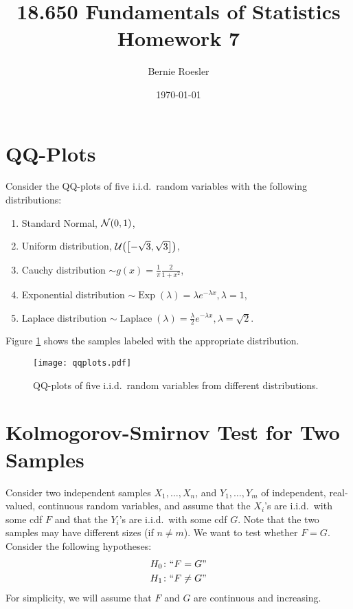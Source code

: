 \documentclass[letterpaper, reqno]{amsart}
\title[Homework 7 -- Problem \thesection]{18.650 Fundamentals of Statistics\\{\large Homework 7}}
\author{Bernie Roesler}
\date{\today}
\numberwithin{equation}{section}
\newcommand{\N}[2]{\mathcal{N}\mleft( #1, #2 \mright)}
\newcommand{\U}[2]{\mathcal{U}\mleft(\mleft[ #1, #2 \mright]\mright)}
\newcommand{\iid}{i.i.d.}
\begin{document}

\graphicspath{{./figures/}}

\maketitle

\section{QQ-Plots}
Consider the QQ-plots of five \iid\ random variables with the following
distributions:
\begin{enumerate}
\item Standard Normal, $\N{0}{1}$,
  \item Uniform distribution, $\U{-\sqrt{3}}{\sqrt{3}}$,
  \item Cauchy distribution $\sim g(x) = \frac{1}{\pi}\frac{2}{1+x^2}$,
  \item Exponential distribution $\sim \operatorname{Exp}(\lambda) = \lambda
    e^{-\lambda x}, \lambda = 1$,
  \item Laplace distribution $\sim \operatorname{Laplace}(\lambda)
    = \frac{\lambda}{2} e^{-\lambda x}, \lambda = \sqrt{2}$.
\end{enumerate}
Figure \ref{fig:qqplots} shows the samples labeled with the appropriate
distribution.

\begin{figure}[!h]
  \centering
  \texttt{[image: qqplots.pdf]}
  \caption{QQ-plots of five \iid\ random variables from different distributions.}
  \label{fig:qqplots}
\end{figure}

\clearpage
\section{Kolmogorov-Smirnov Test for Two Samples}
Consider two independent samples $X_1, \dots, X_n$, and $Y_1, \dots, Y_m$ of
independent, real-valued, continuous random variables, and assume that the $X_i$'s
are \iid\ with some cdf $F$ and that the $Y_i$'s are \iid\ with some cdf $G$. Note that the
two samples may have different sizes (if $n \ne m$). We want to test whether $F = G$.
Consider the following hypotheses:
\begin{align*}
  H_0 \colon ``F = G" \\
  H_1 \colon ``F \ne G"
\end{align*}
For simplicity, we will assume that $F$ and $G$ are continuous and increasing.
\end{document}
